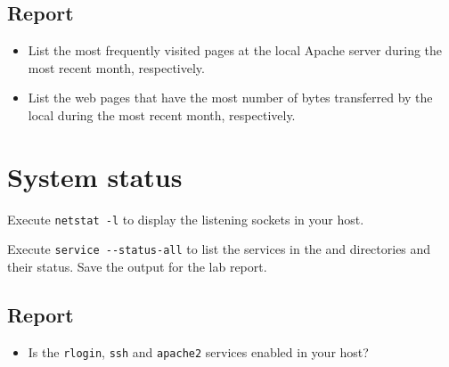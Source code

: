 \documentclass{../UTNetLab}
\begin{document}
    \subsection*{Report}
    \begin{itemize}
        \item List the most frequently visited pages at the local Apache server during the most recent month, respectively.
        \item List the web pages that have the most number of bytes transferred by the local during the most recent month, respectively.
    \end{itemize}

\section{System status}
    Execute \lstinline{netstat -l} to display the listening sockets in your host.

    Execute \lstinline{service --status-all} to list the services in the  and  directories and their status. Save the output for the lab report.
    
    \subsection*{Report}
    \begin{itemize}
        \item Is the \lstinline{rlogin}, \lstinline{ssh} and \lstinline{apache2} services enabled in your host?
    \end{itemize}
\end{document}
